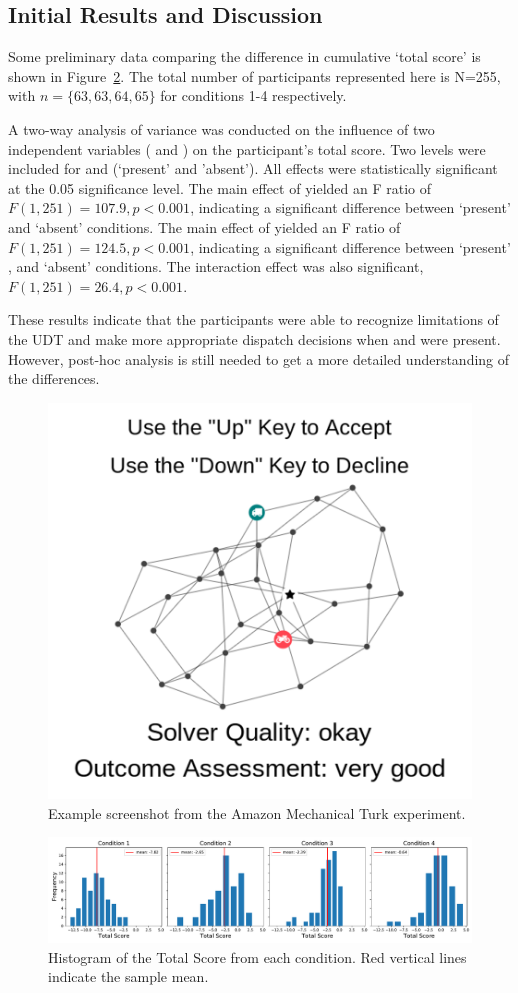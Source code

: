 \subsection{Initial Results and Discussion}
Some preliminary data comparing the difference in cumulative `total score' is shown in Figure~\ref{fig:total_score}. The total number of participants represented here is N=255, with $n=\{63,63,64,65\}$ for conditions 1-4 respectively. 

A two-way analysis of variance was conducted on the influence of two independent variables (\xQ{} and \xO) on the participant's total score. Two levels were included for \xQ{} and \xO{} (`present' and 'absent'). All effects were statistically significant at the 0.05 significance level. The main effect of \xQ{} yielded an F ratio of $F(1,251)=107.9,p<0.001$, indicating a significant difference between \xQ{} `present'  and `absent'  conditions. The main effect of \xO{} yielded an F ratio of $F(1,251)=124.5,p<0.001$, indicating a significant difference between \xO{} `present' , and `absent'  conditions. The interaction effect was also significant, $F(1,251)=26.4,p<0.001$.

These results indicate that the participants were able to recognize limitations of the UDT and make more appropriate dispatch decisions when \xQ{} and \xO{} were present. However, post-hoc analysis is still needed to get a more detailed understanding of the differences.

\begin{figure}[tbp]
    \centering
    \includegraphics[width=0.45\linewidth]{Figures/experiment_screenshot_Compressed.png}
    \caption{Example screenshot from the Amazon Mechanical Turk experiment.} 
    \label{fig:experiment_screenshot}
\end{figure}

\begin{figure}[tbp]
    \centering
    \includegraphics[width=1.0\linewidth]{Figures/total_score.pdf}
    \caption{Histogram of the Total Score from each condition. Red vertical lines indicate the sample mean.}
    \label{fig:total_score}
\end{figure}

